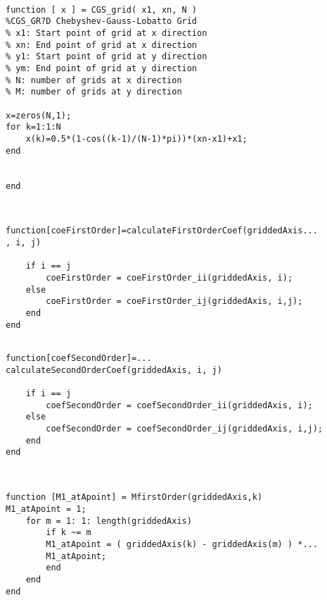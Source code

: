 \begin{lstlisting}

function [ x ] = CGS_grid( x1, xn, N )
%CGS_GR?D Chebyshev-Gauss-Lobatto Grid
% x1: Start point of grid at x direction
% xn: End point of grid at x direction
% y1: Start point of grid at y direction
% ym: End point of grid at y direction
% N: number of grids at x direction
% M: number of grids at y direction

x=zeros(N,1);
for k=1:1:N
    x(k)=0.5*(1-cos((k-1)/(N-1)*pi))*(xn-x1)+x1;
end


end


\end{lstlisting}

\begin{lstlisting}

function[coeFirstOrder]=calculateFirstOrderCoef(griddedAxis...
, i, j)

    if i == j
        coeFirstOrder = coeFirstOrder_ii(griddedAxis, i);
    else
        coeFirstOrder = coeFirstOrder_ij(griddedAxis, i,j);
    end
end

\end{lstlisting}

\begin{lstlisting}

function[coefSecondOrder]=...
calculateSecondOrderCoef(griddedAxis, i, j)

    if i == j
        coefSecondOrder = coefSecondOrder_ii(griddedAxis, i);
    else
        coefSecondOrder = coefSecondOrder_ij(griddedAxis, i,j);
    end
end

\end{lstlisting}

\begin{lstlisting}


function [M1_atApoint] = MfirstOrder(griddedAxis,k)
M1_atApoint = 1;
    for m = 1: 1: length(griddedAxis) 
        if k ~= m
        M1_atApoint = ( griddedAxis(k) - griddedAxis(m) ) *...
        M1_atApoint;
        end
    end
end

\end{lstlisting}


